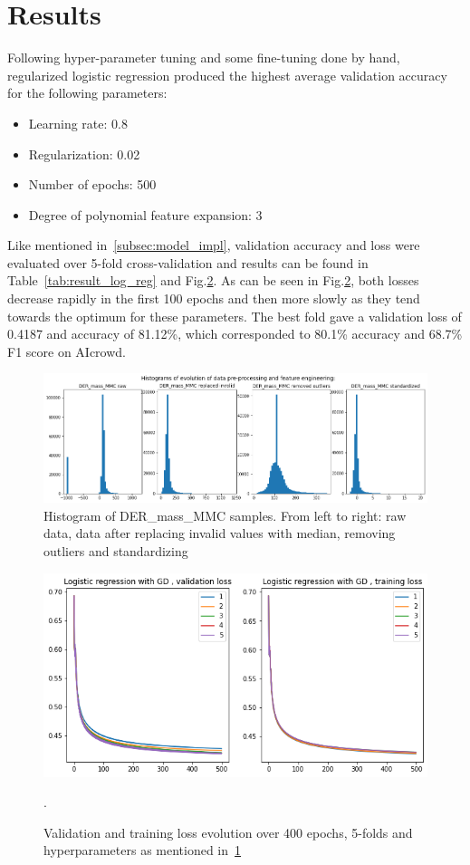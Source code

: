 \documentclass[10pt,conference,compsocconf]{IEEEtran}
\begin{document}
\section{Results}\label{sec: results}
Following hyper-parameter tuning and some fine-tuning done by hand, regularized logistic regression produced the highest average validation accuracy for the following parameters: 
\begin{itemize}
    \item Learning rate: 0.8
    \item Regularization: 0.02
    \item Number of epochs: 500
    \item Degree of polynomial feature expansion: 3
\end{itemize}
Like mentioned in~\ref{subsec:model_impl}, validation accuracy and loss were evaluated over 5-fold cross-validation and results can be found in Table~\ref{tab:result_log_reg} and Fig.\ref{fig:train_val_lr}. As can be seen in Fig.\ref{fig:train_val_lr}, both losses decrease rapidly in the first 100 epochs and then more slowly as they tend towards the optimum for these parameters. The best fold gave a validation loss of 0.4187 and accuracy of 81.12\%, which corresponded to 80.1\% accuracy and 68.7\% F1 score on AIcrowd. 
\begin{figure}
  \centering
  \includegraphics[width=\columnwidth]{report/example_pre_procs.png}
  \caption{Histogram of DER\_mass\_MMC samples. From left to right: raw data, data after replacing invalid values with median, removing outliers and standardizing}
  \vspace{-3mm}
  \label{fig:example_pre_procs}
\end{figure}

\begin{figure}
  \centering
  \includegraphics[width=\columnwidth]{report/train_val_loss.png}
  \caption{Validation and training loss evolution over 400 epochs, 5-folds and hyperparameters as mentioned in~\ref{sec: results}}.
  \vspace{-3mm}
  \label{fig:train_val_lr}
\end{figure}
\end{document}
